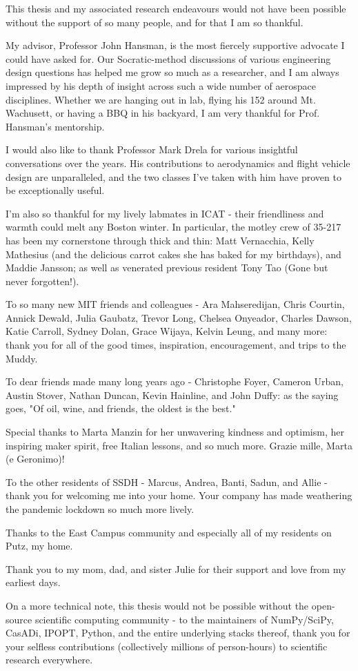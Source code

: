 This thesis and my associated research endeavours would not have been possible without the support of so many people, and for that I am so thankful.

My advisor, Professor John Hansman, is the most fiercely supportive advocate I could have asked for. Our Socratic-method discussions of various engineering design questions has helped me grow so much as a researcher, and I am always impressed by his depth of insight across such a wide number of aerospace disciplines. Whether we are hanging out in lab, flying his 152 around Mt. Wachusett, or having a BBQ in his backyard, I am very thankful for Prof. Hansman's mentorship.

I would also like to thank Professor Mark Drela for various insightful conversations over the years. His contributions to aerodynamics and flight vehicle design are unparalleled, and the two classes I've taken with him have proven to be exceptionally useful.

I'm also so thankful for my lively labmates in ICAT - their friendliness and warmth could melt any Boston winter. In particular, the motley crew of 35-217 has been my cornerstone through thick and thin: Matt Vernacchia, Kelly Mathesius (and the delicious carrot cakes she has baked for my birthdays), and Maddie Jansson; as well as venerated previous resident Tony Tao (Gone but never forgotten!).

To so many new MIT friends and colleagues - Ara Mahseredijan, Chris Courtin, Annick Dewald, Julia Gaubatz, Trevor Long, Chelsea Onyeador, Charles Dawson, Katie Carroll, Sydney Dolan, Grace Wijaya, Kelvin Leung, and many more: thank you for all of the good times, inspiration, encouragement, and trips to the Muddy.

To dear friends made many long years ago - Christophe Foyer, Cameron Urban, Austin Stover, Nathan Duncan, Kevin Hainline, and John Duffy: as the saying goes, "Of oil, wine, and friends, the oldest is the best."

Special thanks to Marta Manzin for her unwavering kindness and optimism, her inspiring maker spirit, free Italian lessons, and so much more. Grazie mille, Marta (e Geronimo)!

To the other residents of SSDH - Marcus, Andrea, Banti, Sadun, and Allie - thank you for welcoming me into your home. Your company has made weathering the pandemic lockdown so much more lively.

Thanks to the East Campus community and especially all of my residents on Putz, my home.

Thank you to my mom, dad, and sister Julie for their support and love from my earliest days. %

On a more technical note, this thesis would not be possible without the open-source scientific computing community - to the maintainers of NumPy/SciPy, CasADi, IPOPT, Python, and the entire underlying stacks thereof, thank you for your selfless contributions (collectively millions of person-hours) to scientific research everywhere.



